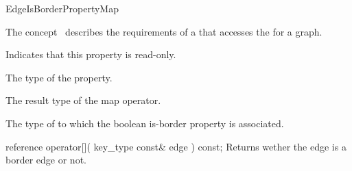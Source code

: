 
\begin{ccRefConcept}{EdgeIsBorderPropertyMap}


\ccDefinition

The concept \ccRefName\ describes the requirements of a  that accesses the  for a graph.

\ccRefines
  
\ccTypes
    {Indicates that this property is read-only.}
  
    {The type of the property.}
    
    {The result type of the map operator.}

  {The type of  to which the boolean is-border property is associated.}

\ccCreation
{}  %

\ccOperations

\ccMethod
  {reference operator[]( key_type const& edge ) const;}
  {Returns wether the edge is a border edge or not.}  


\ccHasModels
{}\\

\ccSeeAlso
{} 

\end{ccRefConcept}



